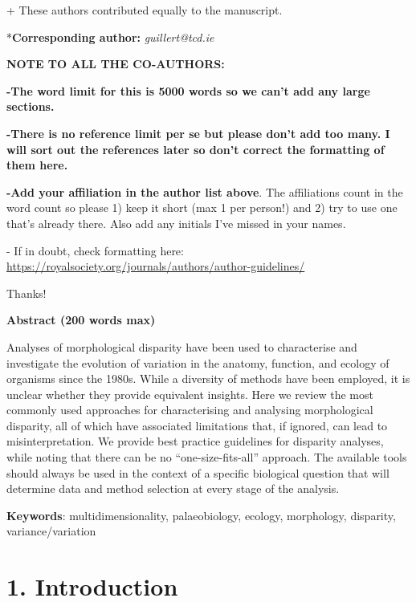 + These authors contributed equally to the manuscript.

*\textbf{Corresponding author:} \emph{guillert@tcd.ie}

\textbf{NOTE TO ALL THE CO-AUTHORS:}

\textbf{-The word limit for this is 5000 words so we can't add any large
sections.}

\textbf{-There is no reference limit per se but please don't add too
many. I will sort out the references later so don't correct the
formatting of them here.}

\textbf{-Add your affiliation in the author list above}. The
affiliations count in the word count so please 1) keep it short (max 1
per person!) and 2) try to use one that's already there. Also add any
initials I've missed in your names.

- If in doubt, check formatting here:
\href{https://royalsociety.org/journals/authors/author-guidelines/}{{https://royalsociety.org/journals/authors/author-guidelines/}}

Thanks!

\textbf{Abstract (200 words max)}

Analyses of morphological disparity have been used to characterise and investigate the evolution of variation in the anatomy, function, and ecology of organisms since the 1980s.
While a diversity of methods have been employed, it is unclear whether they provide
equivalent insights.
Here we review the most commonly used approaches for characterising and analysing morphological disparity, all of which have associated limitations that, if ignored, can lead to misinterpretation.
We provide best practice guidelines for disparity analyses, while noting that there can be no ``one-size-fits-all'' approach.
The available tools should always be used in the context of a specific biological question that will determine data and method selection at every stage of the analysis.

\textbf{Keywords}: multidimensionality, palaeobiology, ecology,
morphology, disparity, variance/variation

\hypertarget{introduction}{%
\section{1. Introduction}\label{introduction}}

